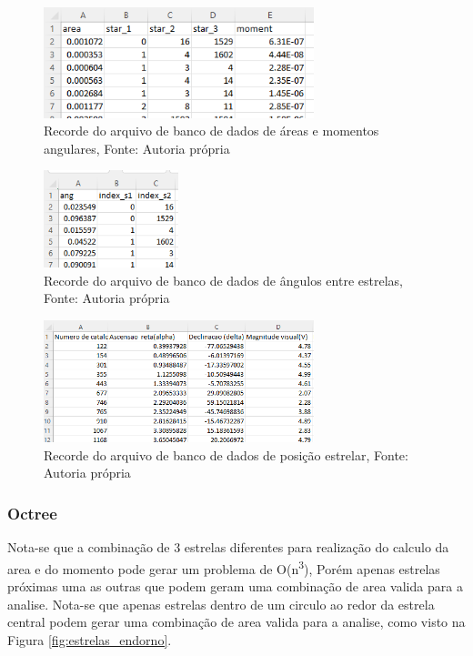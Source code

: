 \begin{figure}[H]
    \centering
    \includegraphics[width=0.7\textwidth]{images/banco_dados_area_moment.png}
    \caption{Recorde do arquivo de banco de dados de áreas e momentos angulares, Fonte: Autoria própria}
    \label{fig:banco_dados_area_moment_to_cubesat}
\end{figure}

\begin{figure}[H]
    \centering
    \includegraphics[width=0.35\textwidth]{images/banco_dados_angulo.png}
    \caption{Recorde do arquivo de banco de dados de ângulos entre estrelas, Fonte: Autoria própria}
    \label{fig:banco_dados_angulo}
\end{figure}

\begin{figure}[H]
    \centering
    \includegraphics[width=0.7\textwidth]{images/banco_dados_posicao.png}
    \caption{Recorde do arquivo de banco de dados de posição estrelar, Fonte: Autoria própria}
    \label{fig:banco_dados_posicao}
\end{figure}

\subsubsection{Octree}

Nota-se que a combinação de 3 estrelas diferentes para realização do calculo da area e do momento pode gerar um problema de O(n\textsuperscript{3}),
Porém apenas estrelas próximas uma as outras que podem geram uma combinação de area valida para a analise.
Nota-se que apenas estrelas dentro de um circulo ao redor da estrela central podem gerar uma combinação de area valida para a analise, como visto na Figura \ref{fig:estrelas_endorno}.


